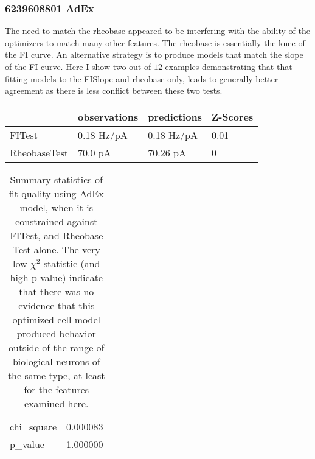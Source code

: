 \subsubsection{6239608801 AdEx}
The need to match the rheobase appeared to be interfering with the ability of the optimizers to match many other features.
The rheobase is essentially the knee of the FI curve.
An alternative strategy is to produce models that match the slope of the FI curve.
Here I show two out of $12$ examples demonstrating that that fitting models to the FISlope and rheobase only, leads to generally better agreement as there is less conflict between these two tests.

\begin{table}
\begin{center}
\begin{tabular}{|l|l|l|l|}
\toprule
{} & observations &   predictions & Z-Scores \\
\midrule
FITest       &   0.18 Hz/pA &  0.18 Hz/pA &     0.01 \\
RheobaseTest &      70.0 pA &      70.26 pA &        0 \\
\bottomrule
\end{tabular}
\end{center}
\end{table}

\begin{table}
\begin{center}
\begin{tabular}{|l|r|}
\toprule
chi\_square &  0.000083 \\
p\_value    &  1.000000 \\
\bottomrule
\end{tabular}
\end{center}
\caption[Quality of Fit to Experimental Data]{Summary statistics of fit quality using AdEx model, when it is constrained against FITest, and Rheobase Test alone.
The very low $\chi^2$ statistic (and high p-value) indicate that there was no evidence that this optimized cell model produced behavior outside of the range of biological neurons of the same type, at least for the features examined here.}
\label{tab:chi2-p-1}
\end{table}


